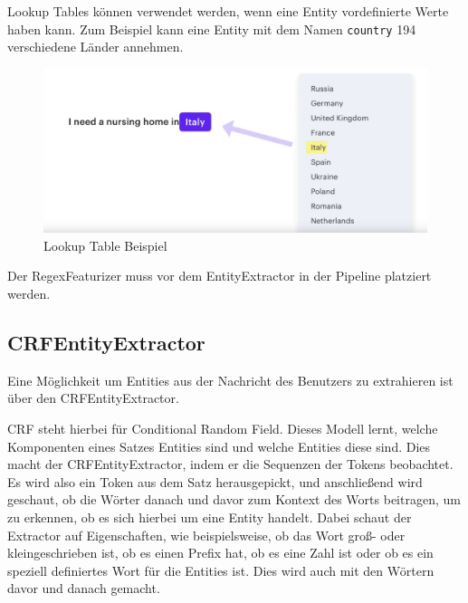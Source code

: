 Lookup Tables können verwendet werden, wenn eine Entity vordefinierte Werte haben kann.
Zum Beispiel kann eine Entity mit dem Namen \texttt{country} 194 verschiedene Länder annehmen.\cite{rasaMasterclassRegexFeaturizer, pipelineComponentsYoutube, regexFeaturizerCrf}

\begin{figure}[hbt!]
    \centering
    \includegraphics[scale=0.25]{pics/lookup-table-example}
    \caption{Lookup Table Beispiel~\cite{pipelineComponentsYoutube}}
    \label{fig:Lookup Table Beispiel}
\end{figure}

Der RegexFeaturizer muss vor dem EntityExtractor in der Pipeline platziert werden.\cite{rasaMasterclassRegexFeaturizer, pipelineComponentsYoutube, regexFeaturizerCrf}

\subsection{CRFEntityExtractor}\label{subsec:crfentityextractor}

Eine Möglichkeit um Entities aus der Nachricht des Benutzers zu extrahieren ist über den CRFEntityExtractor.\cite{crfEntityExtractor}

CRF steht hierbei für Conditional Random Field.
Dieses Modell lernt, welche Komponenten eines Satzes Entities sind und welche Entities diese sind.\cite{crfEntityExtractor, pipelineComponentsYoutube, regexFeaturizerCrf}
\ci
Dies macht der CRFEntityExtractor, indem er die Sequenzen der Tokens beobachtet.
Es wird also ein Token aus dem Satz herausgepickt, und anschließend wird geschaut, ob die Wörter danach und davor zum Kontext des Worts beitragen, um zu erkennen, ob es sich hierbei um eine Entity handelt.
Dabei schaut der Extractor auf Eigenschaften, wie beispielsweise, ob das Wort groß- oder kleingeschrieben ist, ob es einen Prefix hat, ob es eine Zahl ist oder ob es ein speziell definiertes Wort für die Entities ist.
Dies wird auch mit den Wörtern davor und danach gemacht.\cite{crfEntityExtractor, pipelineComponentsYoutube, regexFeaturizerCrf}

